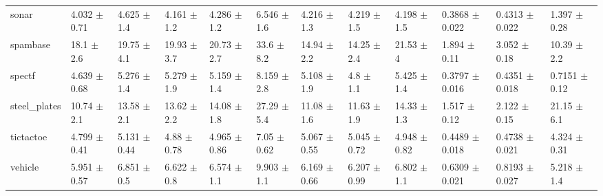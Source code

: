 \begin{tabular}{llllllllllll}
sonar & 4.032 $\pm$ 0.71 & 4.625 $\pm$ 1.4 & 4.161 $\pm$ 1.2 & 4.286 $\pm$ 1.2 & 6.546 $\pm$ 1.6 & 4.216 $\pm$ 1.3 & 4.219 $\pm$ 1.5 & 4.198 $\pm$ 1.5 & 0.3868 $\pm$ 0.022 & 0.4313 $\pm$ 0.022 & 1.397 $\pm$ 0.28 \\
spambase & 18.1 $\pm$ 2.6 & 19.75 $\pm$ 4.1 & 19.93 $\pm$ 3.7 & 20.73 $\pm$ 2.7 & 33.6 $\pm$ 8.2 & 14.94 $\pm$ 2.2 & 14.25 $\pm$ 2.4 & 21.53 $\pm$ 4 & 1.894 $\pm$ 0.11 & 3.052 $\pm$ 0.18 & 10.39 $\pm$ 2.2 \\
spectf & 4.639 $\pm$ 0.68 & 5.276 $\pm$ 1.4 & 5.279 $\pm$ 1.9 & 5.159 $\pm$ 1.4 & 8.159 $\pm$ 2.8 & 5.108 $\pm$ 1.9 & 4.8 $\pm$ 1.1 & 5.425 $\pm$ 1.4 & 0.3797 $\pm$ 0.016 & 0.4351 $\pm$ 0.018 & 0.7151 $\pm$ 0.12 \\
steel\_plates & 10.74 $\pm$ 2.1 & 13.58 $\pm$ 2.1 & 13.62 $\pm$ 2.2 & 14.08 $\pm$ 1.8 & 27.29 $\pm$ 5.4 & 11.08 $\pm$ 1.6 & 11.63 $\pm$ 1.9 & 14.33 $\pm$ 1.3 & 1.517 $\pm$ 0.12 & 2.122 $\pm$ 0.15 & 21.15 $\pm$ 6.1 \\
tictactoe & 4.799 $\pm$ 0.41 & 5.131 $\pm$ 0.44 & 4.88 $\pm$ 0.78 & 4.965 $\pm$ 0.86 & 7.05 $\pm$ 0.62 & 5.067 $\pm$ 0.55 & 5.045 $\pm$ 0.72 & 4.948 $\pm$ 0.82 & 0.4489 $\pm$ 0.018 & 0.4738 $\pm$ 0.021 & 4.324 $\pm$ 0.31 \\
vehicle & 5.951 $\pm$ 0.57 & 6.851 $\pm$ 0.5 & 6.622 $\pm$ 0.8 & 6.574 $\pm$ 1.1 & 9.903 $\pm$ 1.1 & 6.169 $\pm$ 0.66 & 6.207 $\pm$ 0.99 & 6.802 $\pm$ 1.1 & 0.6309 $\pm$ 0.021 & 0.8193 $\pm$ 0.027 & 5.218 $\pm$ 1.4 \\
\bottomrule
\end{tabular}
